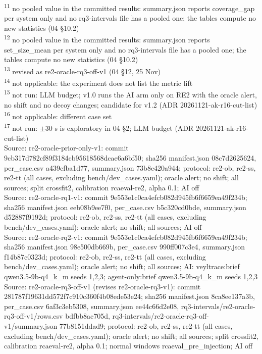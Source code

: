 \begin{table}[t]
\textsuperscript{11} no pooled value in the committed results: summary.json reports coverage\_gap per system only and no rq3-intervals file has a pooled one; the tables compute no new statistics (04 \S{}10.2)\\
\textsuperscript{12} no pooled value in the committed results: summary.json reports set\_size\_mean per system only and no rq3-intervals file has a pooled one; the tables compute no new statistics (04 \S{}10.2)\\
\textsuperscript{13} revised as re2-oracle-rq3-off-v1 (04 \S{}12, 25 Nov)\\
\textsuperscript{14} not applicable: the experiment does not list the metric lift\\
\textsuperscript{15} not run: LLM budget; v1.0 runs the AI arm only on RE2 with the oracle alert, no shift and no decoy changes; candidate for v1.2 (ADR 20261121-ak-r16-cut-list)\\
\textsuperscript{16} not applicable: different case set\\
\textsuperscript{17} not run: $\pm$30 s is exploratory in 04 \S{}2; LLM budget (ADR 20261121-ak-r16-cut-list)\\
Source: re2-oracle-prior-only-v1: commit 9cb317d782cf89f3184cb95618568dcae6a6bf50; sha256 manifest.json 08c7d2625624, per\_case.csv a439cfba1d77, summary.json 73b8e420a944; protocol: re2-ob, re2-ss, re2-tt (all cases, excluding bench/dev\_cases.yaml); oracle alert; no shift; all sources; split crossfit2, calibration rcaeval-re2, alpha 0.1; AI off\\
Source: re2-oracle-rq1-v1: commit 9e553e1c0ca4efcb082d945fb6f6659ea49f234b; sha256 manifest.json eeb08b9ee7f0, per\_case.csv b5c320cd0bde, summary.json d52887f9192d; protocol: re2-ob, re2-ss, re2-tt (all cases, excluding bench/dev\_cases.yaml); oracle alert; no shift; all sources; AI off\\
Source: re2-oracle-rq2-v1: commit 9e553e1c0ca4efcb082d945fb6f6659ea49f234b; sha256 manifest.json 98e500db669b, per\_case.csv 990ff007c3e4, summary.json f14b87c0323d; protocol: re2-ob, re2-ss, re2-tt (all cases, excluding bench/dev\_cases.yaml); oracle alert; no shift; all sources; AI: veyltrace:brief qwen3.5-9b-q4\_k\_m seeds 1,2,3; agent-only:brief qwen3.5-9b-q4\_k\_m seeds 1,2,3\\
Source: re2-oracle-rq3-off-v1 (revises re2-oracle-rq3-v1): commit 281787f19631dd572f7c910c360f4b08ede53e24; sha256 manifest.json 8ca8ee137a3b, per\_case.csv 6af3c3eb5308, summary.json ee44c66d2e08, rq3-intervals/re2-oracle-rq3-off-v1/rows.csv bdfbb8ac705d, rq3-intervals/re2-oracle-rq3-off-v1/summary.json 77b8151ddad9; protocol: re2-ob, re2-ss, re2-tt (all cases, excluding bench/dev\_cases.yaml); oracle alert; no shift; all sources; split crossfit2, calibration rcaeval-re2, alpha 0.1; normal windows rcaeval\_pre\_injection; AI off\\

\end{table}
